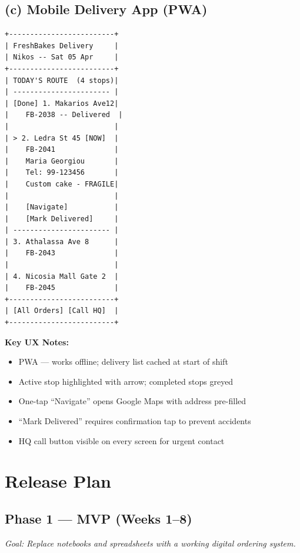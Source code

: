 \documentclass[12pt, a4paper]{report}
\begin{document}
\subsection{(c) Mobile Delivery App (PWA)}

\begin{lstlisting}[style=wireframe]
+-------------------------+
| FreshBakes Delivery     |
| Nikos -- Sat 05 Apr     |
+-------------------------+
| TODAY'S ROUTE  (4 stops)|
| ----------------------- |
| [Done] 1. Makarios Ave12|
|    FB-2038 -- Delivered  |
|                         |
| > 2. Ledra St 45 [NOW]  |
|    FB-2041              |
|    Maria Georgiou       |
|    Tel: 99-123456       |
|    Custom cake - FRAGILE|
|                         |
|    [Navigate]           |
|    [Mark Delivered]     |
| ----------------------- |
| 3. Athalassa Ave 8      |
|    FB-2043              |
|                         |
| 4. Nicosia Mall Gate 2  |
|    FB-2045              |
+-------------------------+
| [All Orders] [Call HQ]  |
+-------------------------+
\end{lstlisting}

\textbf{Key UX Notes:}
\begin{itemize}[noitemsep]
  \item PWA --- works offline; delivery list cached at start of shift
  \item Active stop highlighted with arrow; completed stops greyed
  \item One-tap ``Navigate'' opens Google Maps with address pre-filled
  \item ``Mark Delivered'' requires confirmation tap to prevent accidents
  \item HQ call button visible on every screen for urgent contact
\end{itemize}

\section{Release Plan}

\subsection{Phase 1 --- MVP (Weeks 1--8)}

\textit{Goal: Replace notebooks and spreadsheets with a working digital
ordering system.}
\end{document}
